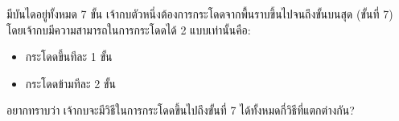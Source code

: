 ﻿%
\question มีบันไดอยู่ทั้งหมด 7 ขั้น เจ้ากบตัวหนึ่งต้องการกระโดดจากพื้นราบขึ้นไปจนถึงขั้นบนสุด (ขั้นที่ 7) โดยเจ้ากบมีความสามารถในการกระโดดได้ 2 แบบเท่านั้นคือ:
\begin{itemize}
  \item กระโดดขึ้นทีละ 1 ขั้น
  \item กระโดดข้ามทีละ 2 ขั้น
\end{itemize}
อยากทราบว่า เจ้ากบจะมีวิธีในการกระโดดขึ้นไปถึงขั้นที่ 7 ได้ทั้งหมดกี่วิธีที่แตกต่างกัน?
\newline
{}
